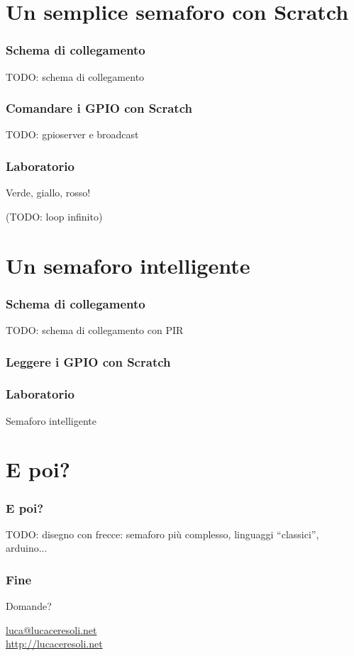 \documentclass[xetex,table]{beamer}
\begin{document}
\section{Un semplice semaforo con Scratch}

\begin{frame}
  \frametitle{Schema di collegamento}
  TODO: schema di collegamento
\end{frame}

\begin{frame}
  \frametitle{Comandare i GPIO con Scratch}
  TODO: gpioserver e broadcast
\end{frame}

\begin{frame}
\frametitle[Lab! Verde, giallo, rosso!]{Laboratorio}
  \begin{center}
    \LARGE
    Verde, giallo, rosso!

    (TODO: loop infinito)
  \end{center}
\end{frame}

\section{Un semaforo intelligente}

\begin{frame}
  \frametitle{Schema di collegamento}
  TODO: schema di collegamento con PIR
\end{frame}

\begin{frame}
  \frametitle{Leggere i GPIO con Scratch}
\end{frame}

\begin{frame}
\frametitle[Lab! Semaforo intelligente!]{Laboratorio}
  \begin{center}
    \LARGE
    Semaforo intelligente
  \end{center}
\end{frame}

\section{E poi?}

\begin{frame}
  \frametitle{E poi?}
  TODO: disegno con frecce: semaforo più complesso, linguaggi ``classici'', arduino...
\end{frame}

\begin{frame}
  \frametitle{Fine}

  \begin{center}
    {\Huge Domande?}

    \vspace{0.1\textheight}

    \href{mailto:luca@lucaceresoli.net}{luca@lucaceresoli.net}\\
    \url{http://lucaceresoli.net}
  \end{center}
\end{frame}
\end{document}
